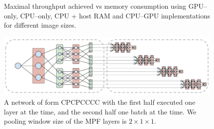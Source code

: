 \documentclass[conference]{./IEEEtran/IEEEtran}
\begin{document}
  \begin{figure}[!htbp]
    \centering

    \caption{Maximal throughput achieved vs memory consumption using
      GPU--only, CPU--only, CPU + host RAM and CPU--GPU
      implementations for different image sizes.}
    \label{fig:final_results}
  \end{figure}

  \begin{figure}
    \begin{center}
      \includegraphics[width=0.99\columnwidth]{fig/layer_vs_batch.pdf}
    \end{center}
    \caption{A network of form CPCPCCCC with the first half executed
      one layer at the time, and the second half one batch at the
      time.  We pooling window size of the MPF layers is $2 \times 1
      \times 1$. }
    \label{fig:layer-vs-batch}
  \end{figure}
\end{document}
